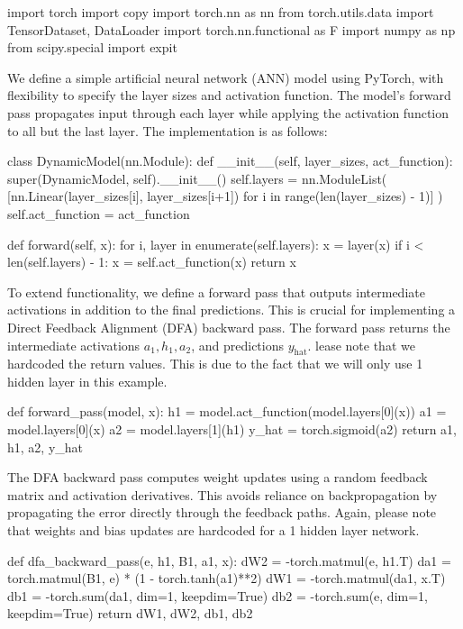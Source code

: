 \documentclass[english]{article}
\begin{document}
\begin{python}
import torch
import copy
import torch.nn as nn
from torch.utils.data import TensorDataset, DataLoader
import torch.nn.functional as F
import numpy as np
from scipy.special import expit
\end{python}

We define a simple artificial neural network (ANN) model using PyTorch, with flexibility to specify the layer sizes and activation function. The model's forward pass propagates input through each layer while applying the activation function to all but the last layer. The implementation is as follows:

\begin{python}
class DynamicModel(nn.Module):
    def __init__(self, layer_sizes, act_function):
        super(DynamicModel, self).__init__()
        self.layers = nn.ModuleList(
            [nn.Linear(layer_sizes[i], layer_sizes[i+1]) for i in range(len(layer_sizes) - 1)]
        )
        self.act_function = act_function

    def forward(self, x):
        for i, layer in enumerate(self.layers):
            x = layer(x)
            if i < len(self.layers) - 1:
                x = self.act_function(x)
        return x
\end{python}

To extend functionality, we define a forward pass that outputs intermediate activations in addition to the final predictions. This is crucial for implementing a Direct Feedback Alignment (DFA) backward pass. The forward pass returns the intermediate activations \(a_1, h_1, a_2\), and predictions \(y_{\text{hat}}\). lease note that we hardcoded the return values. This is due to the fact that we will only use 1 hidden layer in this example. 

\begin{python}
def forward_pass(model, x):
    h1 = model.act_function(model.layers[0](x))
    a1 = model.layers[0](x)
    a2 = model.layers[1](h1)
    y_hat = torch.sigmoid(a2)
    return a1, h1, a2, y_hat
\end{python}

The DFA backward pass computes weight updates using a random feedback matrix and activation derivatives. This avoids reliance on backpropagation by propagating the error directly through the feedback paths. Again, please note that weights and bias updates are hardcoded for a 1 hidden layer network.

\begin{python}
def dfa_backward_pass(e, h1, B1, a1, x):
    dW2 = -torch.matmul(e, h1.T)
    da1 = torch.matmul(B1, e) * (1 - torch.tanh(a1)**2)
    dW1 = -torch.matmul(da1, x.T)
    db1 = -torch.sum(da1, dim=1, keepdim=True)
    db2 = -torch.sum(e, dim=1, keepdim=True)
    return dW1, dW2, db1, db2
\end{python}
\end{document}
